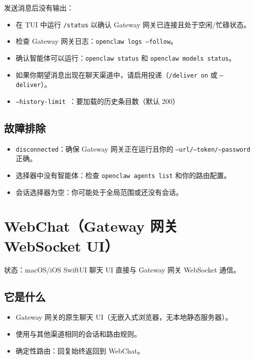 发送消息后没有输出：

\begin{itemize}
  \item 在 TUI 中运行 \texttt{/status} 以确认 Gateway 网关已连接且处于空闲/忙碌状态。
  \item 检查 Gateway 网关日志：\texttt{openclaw logs --follow}。
  \item 确认智能体可以运行：\texttt{openclaw status} 和 \texttt{openclaw models status}。
  \item 如果你期望消息出现在聊天渠道中，请启用投递（\texttt{/deliver on} 或 \texttt{--deliver}）。
  \item \texttt{--history-limit }：要加载的历史条目数（默认 200）
\end{itemize}


\subsection{故障排除}


\begin{itemize}
  \item \texttt{disconnected}：确保 Gateway 网关正在运行且你的 \texttt{--url/--token/--password} 正确。
  \item 选择器中没有智能体：检查 \texttt{openclaw agents list} 和你的路由配置。
  \item 会话选择器为空：你可能处于全局范围或还没有会话。
\end{itemize}



\clearpage

\section{WebChat（Gateway 网关 WebSocket UI）}


状态：macOS/iOS SwiftUI 聊天 UI 直接与 Gateway 网关 WebSocket 通信。

\subsection{它是什么}


\begin{itemize}
  \item Gateway 网关的原生聊天 UI（无嵌入式浏览器，无本地静态服务器）。
  \item 使用与其他渠道相同的会话和路由规则。
  \item 确定性路由：回复始终返回到 WebChat。
\end{itemize}


